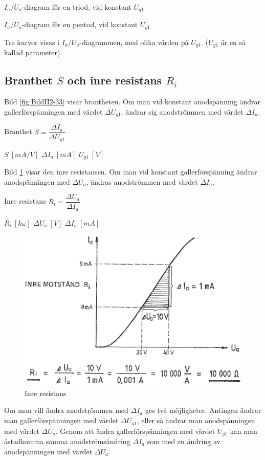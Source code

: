 \(I_a/U_a\)-diagram för en triod, vid konstant \(U_{g1}\)

\(I_a/U_a\)-diagram för en pentod, vid konstant \(U_{g1}\)

Tre kurvor visas i \(I_a/U_a\)-diagrammen, med olika värden på
\(U_{g1}\). (\(U_{g1}\) är en så kallad parameter).

\subsection{Branthet $S$ och inre resistans $R_i$}

Bild \ref{fig:BildII2-33} visar brantheten.
Om man vid konstant anodspänning ändrar gallerförspänningen med värdet
\(\Delta U_{g1}\), ändrar sig anodströmmen med värdet \(\Delta I_a\).

Branthet \(S = \dfrac{\Delta I_a}{\Delta U_{g1}}\)

\(S\ [mA/V]\) \(\Delta I_a\ [mA]\) \(U_{g1}\ [V]\)

Bild \ref{fig:BildII2-34} visar den inre resistansen.
Om man vid konstant gallerförspänning ändrar anodspänningen med
\(\Delta U_a\), ändras anodströmmen med värdet \(\Delta I_a\).

Inre resistans \(R_i = \dfrac{\Delta U_a}{\Delta I_a}\)

\(R_i\ [k \omega]\)  \(\Delta U_a\ [V]\)  \(\Delta I_a\ [mA]\)

\begin{figure}[ht]
\includegraphics[width=\textwidth]{images/cropped_pdfs/bild_2_2-34.pdf}
\caption{Inre resistans}
\label{fig:BildII2-34}
\end{figure}

Om man vill ändra anodströmmen med \(\Delta I_a\) ges två möjligheter.
Antingen ändrar man gallerförspänningen med värdet \(\Delta U_{g1}\), eller så
ändrar man anodspänningen med värdet \(\Delta U_a\).
Genom att ändra gallerförspänningen med värdet \(U_{g1}\) kan man åstadkomma
samma anodströmsändring \(\Delta I_a\) som med en ändring av anodspänningen
med värdet \(\Delta U_a\).

